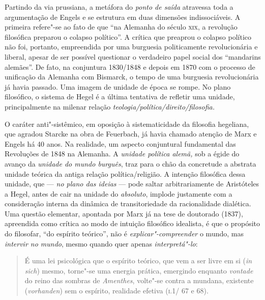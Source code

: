 Partindo da via prussiana, a metáfora do \emph{ponto de saída} atravessa
toda a argumentação de Engels e se estrutura em duas dimensões
indissociáveis. A primeira refere"-se ao fato de que ``na Alemanha do
século \textsc{xix}, a revolução filosófica preparou o colapso
político''. A crítica que preaprou o colapso político não foi, portanto,
empreendida por uma burguesia politicamente revolucionária e liberal,
apesar de ser possível questionar o verdadeiro papel social dos
``mandarins alemães''. De fato, na conjuntura 1830/1848 e depois em 1870
com o processo de unificação da Alemanha com Bismarck, o tempo de uma
burguesia revolucionária já havia passado. Uma imagem de unidade de
época se rompe. No plano filosófico, o sistema de Hegel é a última
tentativa de refletir uma unidade, principalmente na milenar relação
\emph{teologia/política/direito/filosofia.}

O caráter anti"-sistêmico, em oposição à sistematicidade da filosofia
hegeliana, que agradou Starcke na obra de Feuerbach, já havia chamado
atenção de Marx e Engels há 40 anos. Na realidade, um aspecto
conjuntural fundamental das Revoluções de 1848 na Alemanha. A
\emph{unidade política alemã,} sob a égide do avanço da \emph{unidade do
mundo burguês}, traz para o chão da concretude a abstrata unidade
teórica da antiga relação política/religião. A intenção filosófica dessa
unidade, que --- \emph{no plano das ideias} --- pode saltar
arbitrariamente de Aristóteles a Hegel, antes de cair na unidade do
\emph{absoluto}, implode justamente com a consideração interna da
dinâmica de transitoriedade da racionalidade dialética. Uma questão
elementar, apontada por Marx já na tese de doutorado (1837), apreendida
como crítica ao modo de intuição filosófico idealista, é que o propósito
do filosofar, ``do espírito teórico'', não é
\emph{explicar"-compreender} o mundo, mas \emph{intervir no mundo},
mesmo quando quer apenas \emph{interpretá"-lo}:

\begin{quote}
É uma lei psicológica que o espírito teórico, que vem a ser livre em
si (\emph{in sich}) mesmo, torne"-se uma energia prática, emergindo
enquanto \emph{vontade} do reino das sombras de \emph{Amenthes},
volte"-se contra a mundana, existente (\emph{vorhanden}) sem o
espírito, realidade efetiva (\textsc{i}.1/ 67 e 68).
\end{quote}

